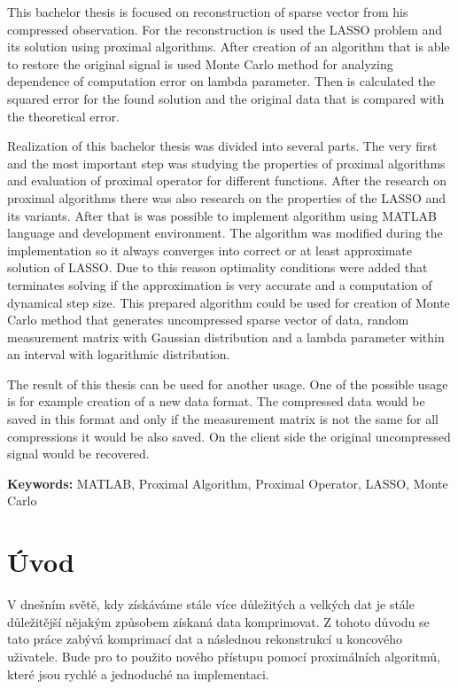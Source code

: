 \documentclass[FM,BP]{tulthesis}
\begin{document}
\vspace{2cm}
\begin{abstractEN}
This bachelor thesis is focused on reconstruction of sparse vector from his compressed observation. For the reconstruction is used the LASSO problem and its solution using proximal algorithms. After creation of an algorithm that is able to restore the original signal is used Monte Carlo method for analyzing dependence of computation error on lambda parameter. Then is calculated the squared error for the found solution and the original data that is compared with the theoretical error.


Realization of this bachelor thesis was divided into several parts. The very first and the most important step was studying the properties of proximal algorithms and evaluation of proximal operator for different functions. After the research on proximal algorithms there was also research on the properties of the LASSO and its variants. After that is was possible to implement algorithm using MATLAB language and development environment. The algorithm was modified during the implementation so it always converges into correct or at least approximate solution of LASSO. Due to this reason optimality conditions were added that terminates solving if the approximation is very accurate and a computation of dynamical step size. This prepared algorithm could be used for creation of Monte Carlo method that generates uncompressed sparse vector of data, random measurement matrix with Gaussian distribution and a lambda parameter within an interval with logarithmic distribution.


The result of this thesis can be used for another usage. One of the possible usage is for example creation of a new data format. The compressed data would be saved in this format and only if the measurement matrix is not the same for all compressions it would be also saved. On the client side the original uncompressed signal would be recovered.


\textbf{Keywords:} MATLAB, Proximal Algorithm, Proximal Operator, LASSO, Monte Carlo
\end{abstractEN}
\clearpage
\tableofcontents

\listoffigures

\pagebreak

\renewcommand{\baselinestretch}{1.5}
\setlength\parindent{1.2cm}
\selectfont

\chapter{Úvod}
\label{ch:uvod}
 V dnešním světě, kdy získáváme stále více důležitých a velkých dat je stále důležitější nějakým způsobem získaná data komprimovat. Z tohoto důvodu se tato práce zabývá komprimací dat a následnou rekonstrukcí u koncového uživatele. Bude pro to použito nového přístupu pomocí proximálních algoritmů, které jsou rychlé a jednoduché na implementaci.
\end{document}
